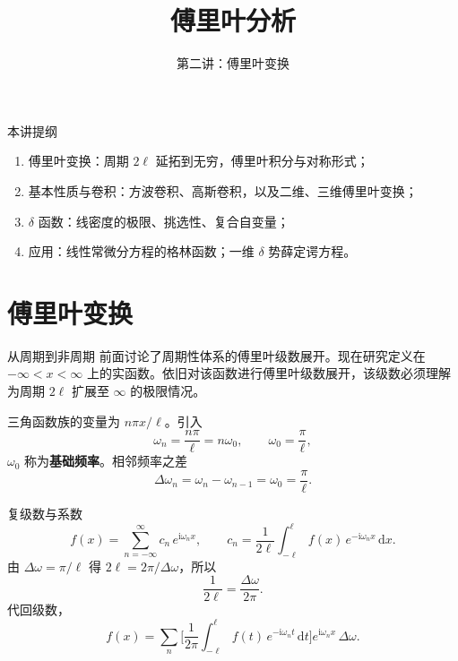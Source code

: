 \documentclass[fontset=windows, chinese, 10pt, xcolor=dvipsnames]{beamer}
\title{傅里叶分析}
\subtitle{第二讲：傅里叶变换}
\begin{document}
\begin{frame}
  \titlepage
\end{frame}

\begin{frame}{本讲提纲}
  \begin{enumerate}
    \item 傅里叶变换：周期 $2\ell$ 延拓到无穷，傅里叶积分与对称形式；
    \item 基本性质与卷积：方波卷积、高斯卷积，以及二维、三维傅里叶变换；
    \item $\delta$ 函数：线密度的极限、挑选性、复合自变量；
    \item 应用：线性常微分方程的格林函数；一维 $\delta$ 势薛定谔方程。
  \end{enumerate}
\end{frame}

\section{傅里叶变换}

\begin{frame}{从周期到非周期}
  前面讨论了周期性体系的傅里叶级数展开。现在研究定义在 $-\infty<x<\infty$ 上的实函数。依旧对该函数进行傅里叶级数展开，该级数必须理解为周期 $2\ell$ 扩展至 $\infty$ 的极限情况。
  \vspace{0.4em}

  三角函数族的变量为 $n\pi x/\ell$。引入
  \begin{equation*}
    \omega_n=\frac{n\pi}{\ell}=n\omega_0,
    \qquad
    \omega_0=\frac{\pi}{\ell},
  \end{equation*}
  $\omega_0$ 称为\textbf{基础频率}。相邻频率之差
  \begin{equation*}
    \Delta\omega_n=\omega_n-\omega_{n-1}=\omega_0=\frac{\pi}{\ell}.
  \end{equation*}
\end{frame}

\begin{frame}{复级数与系数}
  \begin{equation*}
    f(x)=\sum_{n=-\infty}^{\infty} c_n\,e^{\mathrm{i}\omega_n x},
    \qquad
    c_n=\frac{1}{2\ell}\int_{-\ell}^{\ell}
      f(x)\,e^{-\mathrm{i}\omega_n x}\,\mathrm{d}x.
  \end{equation*}
  由 $\Delta\omega=\pi/\ell$ 得 $2\ell=2\pi/\Delta\omega$，所以
  \begin{equation*}
    \frac{1}{2\ell}=\frac{\Delta\omega}{2\pi}.
  \end{equation*}
  代回级数，
  \begin{equation*}
    f(x)=\sum_{n}
      \Biggl[
        \frac{1}{2\pi}\int_{-\ell}^{\ell}
          f(t)\,e^{-\mathrm{i}\omega_n t}\,\mathrm{d}t
      \Biggr]
      e^{\mathrm{i}\omega_n x}\,\Delta\omega.
  \end{equation*}
\end{frame}
\end{document}
